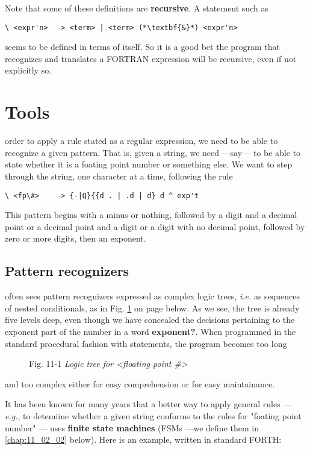 Note that some of these definitions are \textbf{recursive}. A statement such as

\begin{verbatim}
\ <expr'n>  -> <term> | <term> (*\textbf{&}*) <expr'n>
\end{verbatim}

seems to be defined in terms of itself. So it is a good bet the program that recognizes and translates a FORTRAN expression will be recursive, even if not explicitly so.

\section{Tools}
 order to apply a rule stated as a regular expression, we need to be able to recognize a given pattern. That is, given a string, we need —say— to be able to state whether it is a foating point number or something else. We want to step through the string, one character at a time, following the rule

\begin{verbatim}
\ <fp\#>    -> {-|Q}{{d . | .d | d} d ^ exp't
\end{verbatim}

This pattern begins with a minus or nothing, followed by a digit and a decimal point or a decimal point and a digit or a digit with no decimal point, followed by zero or more digits, then an exponent.

\subsection{Pattern recognizers}
 often sees pattern recognizers expressed as complex logic trees, \textit{i.e.} as sequences of nested conditionals, as in Fig. \ref{fig:11_01} on page \pageref{fig:11_01} below. As we see, the tree is already five levels deep, even though we have concealed the decisions pertaining to the exponent part of the number in a word \textbf{exponent?}. When programmed in the standard procedural fashion with  statements, the program becomes too long

\begin{figure}
    \caption{Fig. 11-1 \textit{Logic tree for <floating point \#>}}
    \label{fig:11_01}
\end{figure}

and too complex either for easy comprehension or for easy maintainance.

It has been known for many years that a better way to apply general rules — \textit{e.g.}, to detemiine whether a given string conforms to the rules for "foating point number" --- uses \textbf{finite state machines} (FSMs —we define them in \ref{chap:11_02_02} below). Here is an example, written in standard FORTH:

